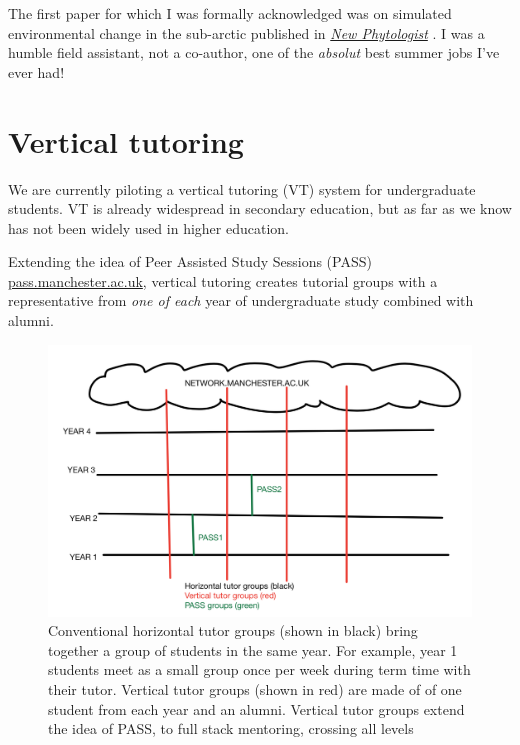 \documentclass[
  12pt,
]{book}
\begin{document}
The first paper for which I was formally acknowledged was on simulated environmental change in the sub-arctic published in \href{https://en.wikipedia.org/wiki/New_Phytologist}{\emph{New Phytologist}} \citep{subarctic}. I was a humble field assistant, not a co-author, one of the \emph{absolut} best summer jobs I've ever had!

\hypertarget{vertical-tutoring}{%
\chapter{Vertical tutoring}\label{vertical-tutoring}}

We are currently piloting a vertical tutoring (VT) system for undergraduate students. VT is already widespread in secondary education, \citep{vtbernard, druryvert} but as far as we know has not been widely used in higher education.

Extending the idea of Peer Assisted Study Sessions (PASS) \href{http://www.pass.manchester.ac.uk}{pass.manchester.ac.uk}, \citep{passeffect} vertical tutoring creates tutorial groups with a representative from \emph{one of each} year of undergraduate study combined with alumni.

\begin{figure}

{\centering \includegraphics[width=1\linewidth]{images/vertical-tutor-groups} 

}

\caption{Conventional horizontal tutor groups (shown in black) bring together a group of students in the same year. For example, year 1 students meet as a small group once per week during term time with their tutor. Vertical tutor groups (shown in red) are made of of one student from each year and an alumni. Vertical tutor groups extend the idea of PASS, to full stack mentoring, crossing all levels}\label{fig:vertical-fig}
\end{figure}
\end{document}
